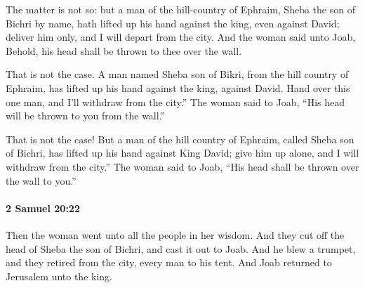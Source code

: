 			\begin{versebox}
					\item[BHS] 
					\item[ASV] The matter is not so: but a man of the hill-country of Ephraim, Sheba the son of Bichri by name, hath lifted up his hand against the king, even against David; deliver him only, and I will depart from the city. And the woman said unto Joab, Behold, his head shall be thrown to thee over the wall.
					\item[NIV] That is not the case. A man named Sheba son of Bikri, from the hill country of Ephraim, has lifted up his hand against the king, against David. Hand over this one man, and I’ll withdraw from the city.” The woman said to Joab, “His head will be thrown to you from the wall.”
					\item[NRSV] That is not the case! But a man of the hill country of Ephraim, called Sheba son of Bichri, has lifted up his hand against King David; give him up alone, and I will withdraw from the city.” The woman said to Joab, “His head shall be thrown over the wall to you.”
			\end{versebox}

		\paragraph{2 Samuel 20:22} %
			\label{2SAMUEL-20-22}

			Then the woman went unto all the people in her wisdom. And they cut off the head of Sheba the son of Bichri, and cast it out to Joab. And he blew a trumpet, and they retired from the city, every man to his tent. And Joab returned to Jerusalem unto the king.

